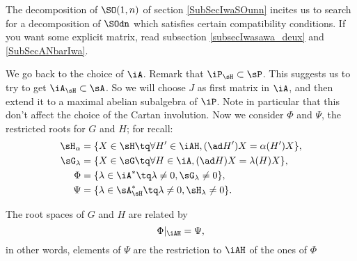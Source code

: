 The decomposition of $\SO(1,n)$ of section \ref{SubSecIwaSOunn} incites us to search for a decomposition of $\SOdn$ which satisfies certain compatibility conditions. If you want some explicit matrix, read subsection \ref{subsecIwasawa_deux} and \ref{SubSecANbarIwa}.

We go back to the choice of $\iA$. Remark that $\iP_{\sH}\subset\sP$. This suggests us to try to get $\iA_{\sH}\subset\sA$. So we will choose $J$ as first matrix in $\iA$, and then extend it to a maximal abelian subalgebra of $\iP$. Note in particular that this don't affect the choice of the Cartan involution. Now we consider $\Phi$ and $\Psi$, the restricted roots for $G$ and $H$; for recall:
\begin{equation}
\begin{split}
  \sH_{\alpha}  &=\{ X\in\sH\tq \forall H'\in\iAH,(\ad H')X=\alpha(H')X \},\\
  \sG_{\lambda} &=\{ X\in\sG\tq \forall H\in\iA,(\ad H)X=\lambda(H)X \},\\
  \Phi        &=\{ \lambda\in\iA^*\tq \lambda\neq 0, \sG_{\lambda}\neq 0 \},\\
  \Psi        &=\{ \lambda\in\sA_{\sH}^*\tq \lambda\neq 0, \sH_{\lambda}\neq 0\}.
\end{split}
\end{equation}

\begin{lemma}
The root spaces of $G$ and $H$ are related by
\[
    \Phi|_{\iAH}=\Psi,
\]
in other words, elements of $\Psi$ are the restriction to $\iAH$ of the ones of $\Phi$
\end{lemma}

